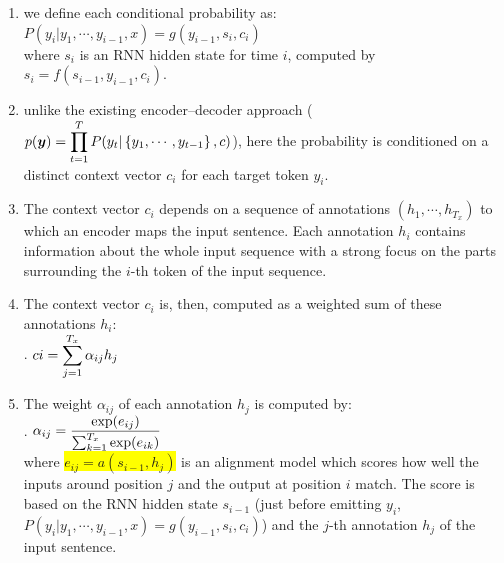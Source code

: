 \begin{enumerate}
    \item we define each conditional probability as:
    $ P(y_i|y_1, \cdots , y_{i-1}, x) = g(y_{i-1}, s_i, c_i) $
    \hfill \cite{arxiv/1409.0473/NMT-Jointly-Learning-Align-Translate}
    \\[0.2cm]
    where $s_i$ is an RNN hidden state for time $i$, computed by 
    $s_i = f (s_{i-1}, y_{i-1}, c_i)$.
    \hfill \cite{arxiv/1409.0473/NMT-Jointly-Learning-Align-Translate}

    \item unlike the existing encoder–decoder approach ($p(\bm{y}) = \displaystyle\prod_{t=1}^T P(y_t | \left\{y_1, \cdots , y_{t-1}\right\} , c)$), here the probability is conditioned on a distinct context vector $c_i$ for each target token $y_i$.
    \hfill \cite{arxiv/1409.0473/NMT-Jointly-Learning-Align-Translate}

    \item The context vector $c_i$ depends on a sequence of annotations $(h_1, \cdots , h_{T_x} )$ to which an encoder maps the input sentence. 
    Each annotation $h_i$ contains information about the whole input sequence with a strong focus on the parts surrounding the $i$-th token of the input sequence. 
    \hfill \cite{arxiv/1409.0473/NMT-Jointly-Learning-Align-Translate}

    \item The context vector $c_i$ is, then, computed as a weighted sum of these annotations $h_i$:
    \hfill \cite{arxiv/1409.0473/NMT-Jointly-Learning-Align-Translate}
    \\[0.2cm]
    .\hfill
    $ ci = \displaystyle\sum_{j=1}^{T_x} \alpha_{ij} h_j  $
    \hfill \cite{arxiv/1409.0473/NMT-Jointly-Learning-Align-Translate}

    \item The weight $\alpha_{ij}$ of each annotation $h_j$ is computed by:
    \hfill \cite{arxiv/1409.0473/NMT-Jointly-Learning-Align-Translate}
    \\[0.2cm]
    .\hfill
    $ \alpha_{ij}  =\dfrac{\exp (e_{ij} )}{\textstyle\sum_{k=1}^{T_x} \exp (e_{ik}) } $
    \hfill \cite{arxiv/1409.0473/NMT-Jointly-Learning-Align-Translate}
    \\[0.2cm]
    where \colorbox{yellow}{$e_{ij} = a(s_{i-1}, h_j )$} is an alignment model which scores how well the inputs around position $j$ and the output at position $i$ match. 
    The score is based on the RNN hidden state $s_{i-1}$ (just before emitting $y_i$, $ P(y_i|y_1, \cdots , y_{i-1}, x) = g(y_{i-1}, s_i, c_i) $) and the $j$-th annotation $h_j$ of the input sentence.
    \hfill \cite{arxiv/1409.0473/NMT-Jointly-Learning-Align-Translate}


\end{enumerate}
